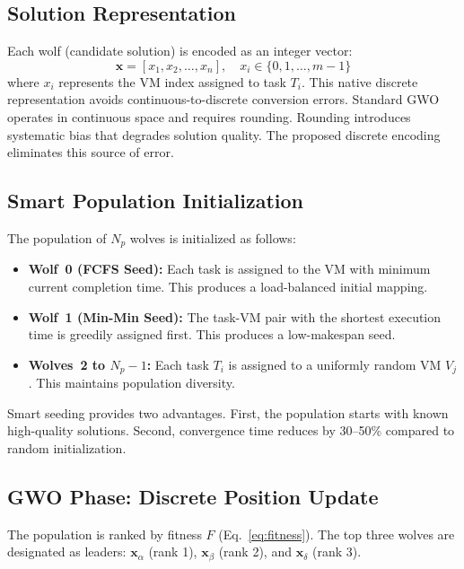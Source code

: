 \documentclass[conference]{IEEEtran}
\begin{document}
\subsection{Solution Representation}

Each wolf (candidate solution) is encoded as an integer vector:
\begin{equation}
    \mathbf{x} = [x_1, x_2, \ldots, x_n], \quad x_i \in \{0, 1, \ldots, m{-}1\}
    \label{eq:encoding}
\end{equation}
where $x_i$ represents the VM index assigned to task $T_i$.
This native discrete representation avoids continuous-to-discrete conversion errors.
Standard GWO operates in continuous space and requires rounding.
Rounding introduces systematic bias that degrades solution quality.
The proposed discrete encoding eliminates this source of error.


\subsection{Smart Population Initialization}

The population of $N_p$ wolves is initialized as follows:
\begin{itemize}
    \item \textbf{Wolf~0 (FCFS Seed):} Each task is assigned to the VM with minimum current completion time. This produces a load-balanced initial mapping.
    \item \textbf{Wolf~1 (Min-Min Seed):} The task-VM pair with the shortest execution time is greedily assigned first. This produces a low-makespan seed.
    \item \textbf{Wolves~2 to $N_p{-}1$:} Each task $T_i$ is assigned to a uniformly random VM $V_j$. This maintains population diversity.
\end{itemize}

Smart seeding provides two advantages.
First, the population starts with known high-quality solutions.
Second, convergence time reduces by 30--50\% compared to random initialization.


\subsection{GWO Phase: Discrete Position Update}

The population is ranked by fitness $F$ (Eq.~\ref{eq:fitness}).
The top three wolves are designated as leaders:
$\mathbf{x}_\alpha$ (rank 1), $\mathbf{x}_\beta$ (rank 2), and $\mathbf{x}_\delta$ (rank 3).
\end{document}
